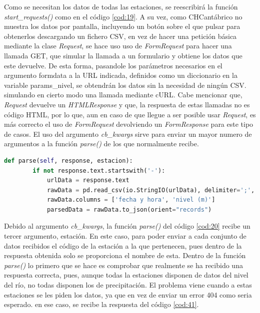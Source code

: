 Como se necesitan los datos de todas las estaciones, se reescribirá la función \textit{start\_requests()} como en el código \ref{cod:19}.\newline
\newline
A su vez, como CHCantábrico no muestra los datos por pantalla, incluyendo un botón sobre el que pulsar para obtenerlos descargando un fichero CSV, en vez de hacer una petición básica mediante la clase \textit{Request}, se hace uso uso de \textit{FormRequest} para hacer una llamada GET, que simular la llamada a un formulario y obtiene los datos que este devuelve.\newline
\newline
De esta forma, pasandole los parámetros necesarios en el argumento formdata a la URL indicada, definidos como un diccionario en la variable params\_nivel, se obtendrán los datos sin la necesidad de ningún CSV. simulando en cierto modo una llamada mediante cURL.\newline
\newline
Cabe mencionar que, \textit{Request} devuelve un \textit{HTMLResponse} y que, la respuesta de estas llamadas no es código HTML, por lo que, aun en caso de que llegue a ser posible usar \textit{Request}, es más correcto el uso de \textit{FormRequest} devolviendo un \textit{FormResponse} para este tipo de casos.\newline
\newline
El uso del argumento \textit{cb\_kwargs} sirve para enviar un mayor numero de argumentos a la función \textit{parse()} de los que normalmente recibe.

\begin{lstlisting}[language=Python, caption={Función \textit{parse()} CHCantábrico Nivel Spider}, label=cod:20]
	def parse(self, response, estacion):
		if not response.text.startswith('-'):
			urlData = response.text
			rawData = pd.read_csv(io.StringIO(urlData), delimiter=';', encoding='utf-8', header=1)
			rawData.columns = ['fecha y hora', 'nivel (m)']
			parsedData = rawData.to_json(orient="records")
\end{lstlisting}

Debido al argumento \textit{cb\_kwargs}, la función \textit{parse()} del código \ref{cod:20} recibe un tercer argumento, estación. En este caso, para poder enviar a cada conjunto de datos recibidos el código de la estación a la que pertenecen, pues dentro de la respuesta obtenida solo se proporciona el nombre de esta. Dentro de la función \textit{parse()} lo primero que se hace es comprobar que realmente se ha recibido una respuesta correcta, pues, aunque todas la estaciones disponen de datos del nivel del río, no todas disponen los de precipitación. El problema viene cuando a estas estaciones se les piden los datos, ya que en vez de enviar un error 404 como seria esperado. en ese caso, se recibe la respuesta del código \ref{cod:41}.

